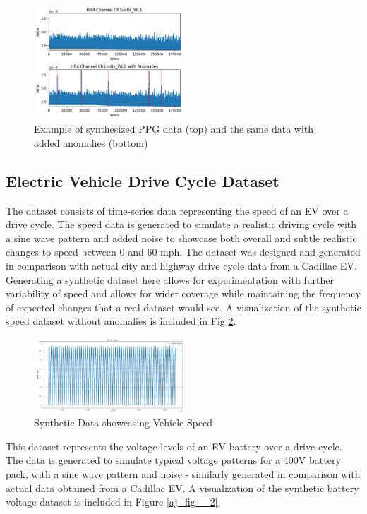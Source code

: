 \documentclass[conference]{IEEEtran}
\begin{document}
\begin{figure}[htbp]
    \centering
    \includegraphics[width=0.5\textwidth]{ck_fig_1.png}
    \caption{Example of synthesized PPG data (top) and the same data with added anomalies (bottom)}
    \label{ck_fig_1}
\end{figure}

\subsection{Electric Vehicle Drive Cycle Dataset}
The dataset consists of time-series data representing the speed of an EV over a drive cycle. The speed data is generated to simulate a realistic driving cycle with a sine wave pattern and added noise to showcase both overall and subtle realistic changes to speed between 0 and 60 mph. The dataset was designed and generated in comparison with actual city and highway drive cycle data from a Cadillac EV. Generating a synthetic dataset here allows for experimentation with further variability of speed and allows for wider coverage while maintaining the frequency of expected changes that a real dataset would see. A visualization of the synthetic speed dataset without anomalies is included in Fig \ref{aj_fig__1}.

\begin{figure}[htbp]
    \centering
    \includegraphics[width=0.5\textwidth]{aj_fig_1.png}
    \caption{Synthetic Data showcasing Vehicle Speed}
    \label{aj_fig__1}
\end{figure}

This dataset represents the voltage levels of an EV battery over a drive cycle. The data is generated to simulate typical voltage patterns for a 400V battery pack, with a sine wave pattern and noise - similarly generated in comparison with actual data obtained from a Cadillac EV. A visualization of the synthetic battery voltage dataset is included in Figure \ref{aj_fig__2}.
\end{document}
